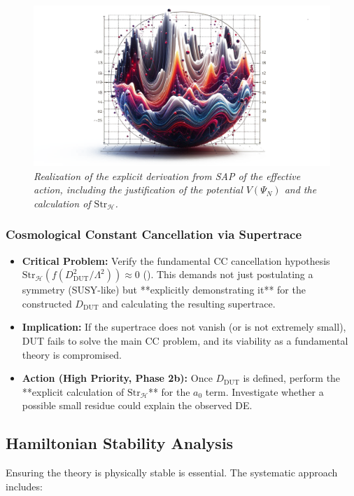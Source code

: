 \documentclass[11pt, a4paper]{article}
\theoremstyle{remark}
\newcommand{\Str}{\mathrm{Str}}
\begin{document}
\begin{figure}[htbp]
    \centering
    \includegraphics[width=0.6\linewidth]{OIG38.ZNLJ.PNG}
    \caption{%
     \footnotesize\textit{Realization of the explicit derivation from SAP of the effective action, including the justification of the potential \(V(\Psi_N)\) and the calculation of \(\Str_{\mathcal{H}}\).}
    }
    \label{fig:Figura19}
\end{figure}

\subsubsection{Cosmological Constant Cancellation via Supertrace}
\label{ssubsec:cc_cancel_challenge_detailed}
\begin{itemize}
    \item \textbf{Critical Problem:} Verify the fundamental CC cancellation hypothesis \( \Str_{\mathcal{H}}(f(D_{\text{DUT}}^2/\Lambda^2)) \approx 0 \) (). This demands not just postulating a symmetry (SUSY-like) but **explicitly demonstrating it** for the constructed \( D_{\text{DUT}} \) and calculating the resulting supertrace.
    \item \textbf{Implication:} If the supertrace does not vanish (or is not extremely small), DUT fails to solve the main CC problem, and its viability as a fundamental theory is compromised.
    \item \textbf{Action (High Priority, Phase 2b):} Once \( D_{\text{DUT}} \) is defined, perform the **explicit calculation of \( \Str_{\mathcal{H}} \)** for the \( a_0 \) term. Investigate whether a possible small residue could explain the observed DE.
\end{itemize}

\subsection{Hamiltonian Stability Analysis }
\label{subsec:hamiltonian_stability_analysis_detailed}

Ensuring the theory is physically stable is essential. The systematic approach includes:
\end{document}
